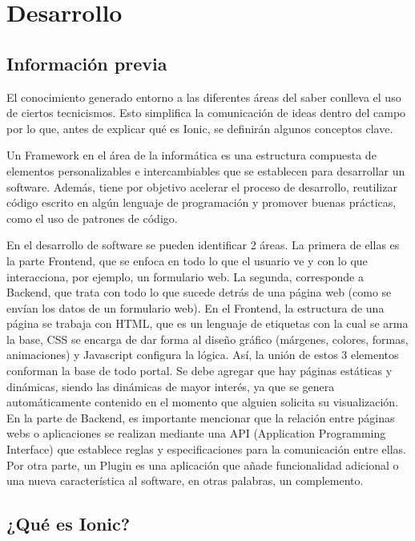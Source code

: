 \section{Desarrollo}

\subsection{Información previa}
El conocimiento generado entorno a las diferentes áreas del saber conlleva el uso de ciertos tecnicismos. Esto simplifica la comunicación de ideas dentro del campo por lo que, antes de explicar qué es Ionic, se definirán algunos conceptos clave. 

Un Framework en el área de la informática es una estructura compuesta de elementos personalizables e intercambiables que se establecen para desarrollar un software. Además, tiene por objetivo acelerar el proceso de desarrollo, reutilizar código escrito en algún lenguaje de programación y promover buenas prácticas, como el uso de patrones de código.

 En el desarrollo de software se pueden identificar 2 áreas. La primera de ellas es la parte Frontend, que se enfoca en todo lo que el usuario ve y con lo que interacciona, por ejemplo, un formulario web. La segunda, corresponde a Backend, que trata con todo lo que sucede detrás de una página web (como se envían los datos de un formulario web). En el Frontend, la estructura de una página se trabaja con HTML, que es un lenguaje de etiquetas con la cual se arma la base, CSS se encarga de dar forma al diseño gráfico (márgenes, colores, formas, animaciones) y Javascript configura la lógica. Así, la unión de estos 3 elementos conforman la base de todo portal. Se debe agregar que hay páginas estáticas y dinámicas, siendo las dinámicas de mayor interés, ya que se genera automáticamente contenido en el momento que alguien solicita su visualización. En la parte de Backend, es importante mencionar que la relación entre páginas webs o aplicaciones se realizan mediante una API (Application Programming Interface) que establece reglas y especificaciones para la comunicación entre ellas. Por otra parte, un Plugin es una aplicación que añade funcionalidad adicional o una nueva característica al software, en otras palabras, un complemento.



\subsection{¿Qué es Ionic?}

